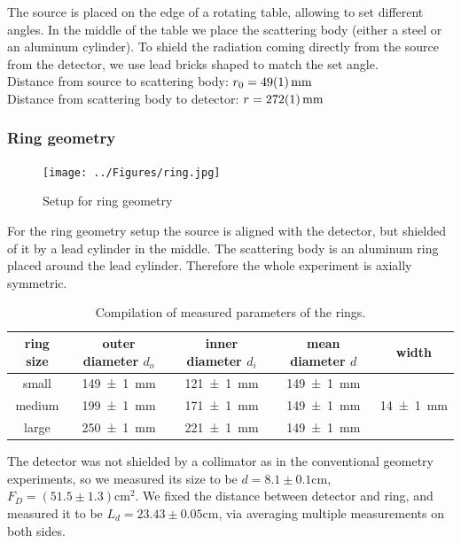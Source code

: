 \documentclass[a4paper,12pt]{article}
\begin{document}
The source is placed on the edge of a rotating table, allowing to set different angles. In the middle of the table we place the scattering body (either a steel or an aluminum cylinder). To shield the radiation coming directly from the source from the detector, we use lead bricks shaped to match the set angle.\\
Distance from source to scattering body: $r_0 = \SI{49+-1}{mm}$\\
Distance from scattering body to detector: $r = \SI{272+-1}{mm}$\\

\subsubsection{Ring geometry}

\begin{figure}[H]
	\centering
	\texttt{[image: ../Figures/ring.jpg]}
	\caption{Setup for ring geometry}
	\label{setCalib}
\end{figure}

For the ring geometry setup the source is aligned with the detector, but shielded of it by a lead cylinder in the middle. The scattering body is an aluminum ring placed around the lead cylinder. Therefore the whole experiment is axially symmetric.

\begin{table}[H]
	\renewcommand{\arraystretch}{1.5}
	\centering
	\begin{tabular}{|c|c|c|c|c|}
		\hline
		ring size & outer diameter $d_o$ & inner diameter $d_i$ & mean diameter $d$ & width\\
		\hline
		small & \SI{149+-1}{mm} & \SI{121+-1}{mm} & \SI{149+-1}{mm} & \multirow{3}{*}{\SI{14+-1}{mm}} \\
		\cline{1-4}
		medium & \SI{199+-1}{mm} & \SI{171+-1}{mm} & \SI{149+-1}{mm} & \\
		\cline{1-4}
		large & \SI{250+-1}{mm} & \SI{221+-1}{mm} & \SI{149+-1}{mm} & \\
		\hline
	\end{tabular}
	\caption{Compilation of measured parameters of the rings. }
	\label{tab:rings }
\end{table}

The detector was not shielded by a collimator as in the conventional geometry experiments, so we measured its size to be $d = 8.1 \pm 0.1$cm, $F_D = (51.5\pm1.3)\si{\centi\meter\squared}$. We fixed the distance between detector and ring, and measured it to be $L_d = 23.43 \pm 0.05$cm, via averaging multiple measurements on both sides.
\end{document}
